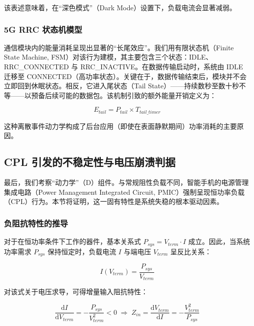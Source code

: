 \documentclass[11pt,a4paper]{ctexart}
\begin{document}
该表述意味着，在“深色模式”（Dark Mode）设置下，负载电流会显著减弱。

\subsubsection{5G RRC 状态机模型}

通信模块内的能量消耗呈现出显著的“长尾效应”。我们用有限状态机（Finite State Machine, FSM）对该行为建模，其主要包含三个状态：IDLE、RRC\_CONNECTED 与 RRC\_INACTIVE。在数据传输启动时，系统由 IDLE 迁移至 CONNECTED（高功率状态）。关键在于，数据传输结束后，模块并不会立即回到休眠状态。相反，它进入尾状态（Tail State）——持续数秒至数十秒不等——以预备后续可能的数据包。该机制引致的额外能量开销定义为：

\begin{equation}
E_{tail} = P_{tail} \times T_{tail\_timer}
\end{equation}

这种离散事件动力学构成了后台应用（即使在表面静默期间）功率消耗的主要原因。

\subsection{CPL 引发的不稳定性与电压崩溃判据}

最后，我们考察“动力学”（D）组件。与常规阻性负载不同，智能手机的电源管理集成电路（Power Management Integrated Circuit, PMIC）强制呈现恒功率负载（CPL）行为。本节将证明，这一固有特性是系统失稳的根本驱动因素。

\subsubsection{负阻抗特性的推导}

对于在恒功率条件下工作的器件，基本关系式 $P_{sys} = V_{term} \cdot I$ 成立。因此，当系统功率需求 $P_{sys}$ 保持恒定时，负载电流 $I$ 与端电压 $V_{term}$ 呈反比关系：

\begin{equation}
I(V_{term}) = \frac{P_{sys}}{V_{term}}
\end{equation}

对该式关于电压求导，可得增量输入阻抗特性：

\begin{equation}
\frac{\mathrm{d}I}{\mathrm{d}V_{term}} = -\frac{P_{sys}}{V_{term}^2} < 0 \;\Longrightarrow\; Z_{in} = \frac{\mathrm{d}V_{term}}{\mathrm{d}I} = -\frac{V_{term}^2}{P_{sys}}
\end{equation}
\end{document}
